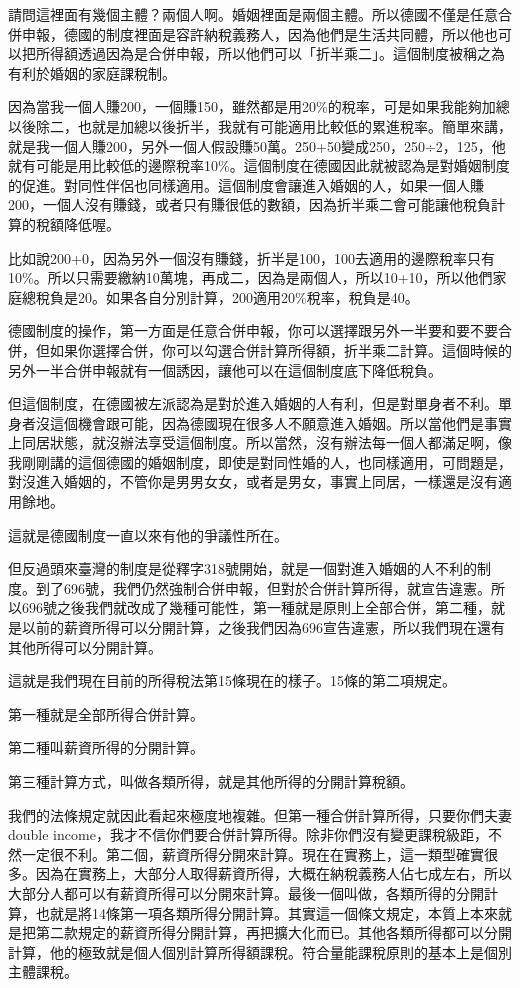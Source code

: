 \documentclass[oneside,sub3section]{ctexbook}
\begin{document}
請問這裡面有幾個主體？兩個人啊。婚姻裡面是兩個主體。所以德國不僅是任意合併申報，德國的制度裡面是容許納稅義務人，因為他們是生活共同體，所以他也可以把所得額透過因為是合併申報，所以他們可以「折半乘二」。這個制度被稱之為有利於婚姻的家庭課稅制。

因為當我一個人賺200，一個賺150，雖然都是用20\%的稅率，可是如果我能夠加總以後除二，也就是加總以後折半，我就有可能適用比較低的累進稅率。簡單來講，就是我一個人賺200，另外一個人假設賺50萬。250+50變成250，250÷2，125，他就有可能是用比較低的邊際稅率10\%。這個制度在德國因此就被認為是對婚姻制度的促進。對同性伴侶也同樣適用。這個制度會讓進入婚姻的人，如果一個人賺200，一個人沒有賺錢，或者只有賺很低的數額，因為折半乘二會可能讓他稅負計算的稅額降低喔。

比如說200+0，因為另外一個沒有賺錢，折半是100，100去適用的邊際稅率只有10\%。所以只需要繳納10萬塊，再成二，因為是兩個人，所以10+10，所以他們家庭總稅負是20。如果各自分別計算，200適用20\%稅率，稅負是40。

德國制度的操作，第一方面是任意合併申報，你可以選擇跟另外一半要和要不要合併，但如果你選擇合併，你可以勾選合併計算所得額，折半乘二計算。這個時候的另外一半合併申報就有一個誘因，讓他可以在這個制度底下降低稅負。

但這個制度，在德國被左派認為是對於進入婚姻的人有利，但是對單身者不利。單身者沒這個機會跟可能，因為德國現在很多人不願意進入婚姻。所以當他們是事實上同居狀態，就沒辦法享受這個制度。所以當然，沒有辦法每一個人都滿足啊，像我剛剛講的這個德國的婚姻制度，即使是對同性婚的人，也同樣適用，可問題是，對沒進入婚姻的，不管你是男男女女，或者是男女，事實上同居，一樣還是沒有適用餘地。

這就是德國制度一直以來有他的爭議性所在。

但反過頭來臺灣的制度是從釋字318號開始，就是一個對進入婚姻的人不利的制度。到了696號，我們仍然強制合併申報，但對於合併計算所得，就宣告違憲。所以696號之後我們就改成了幾種可能性，第一種就是原則上全部合併，第二種，就是以前的薪資所得可以分開計算，之後我們因為696宣告違憲，所以我們現在還有其他所得可以分開計算。

這就是我們現在目前的所得稅法第15條現在的樣子。15條的第二項規定。

第一種就是全部所得合併計算。

第二種叫薪資所得的分開計算。

第三種計算方式，叫做各類所得，就是其他所得的分開計算稅額。

我們的法條規定就因此看起來極度地複雜。但第一種合併計算所得，只要你們夫妻double income，我才不信你們要合併計算所得。除非你們沒有變更課稅級距，不然一定很不利。第二個，薪資所得分開來計算。現在在實務上，這一類型確實很多。因為在實務上，大部分人取得薪資所得，大概在納稅義務人佔七成左右，所以大部分人都可以有薪資所得可以分開來計算。最後一個叫做，各類所得的分開計算，也就是將14條第一項各類所得分開計算。其實這一個條文規定，本質上本來就是把第二款規定的薪資所得分開計算，再把擴大化而已。其他各類所得都可以分開計算，他的極致就是個人個別計算所得額課稅。符合量能課稅原則的基本上是個別主體課稅。
\end{document}
